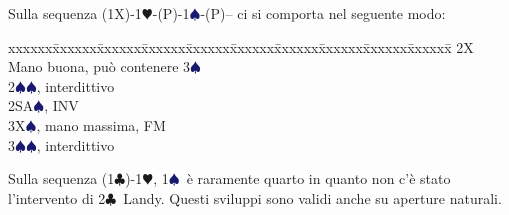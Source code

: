\documentclass[a4paper,italian]{article}
\newcommand{\BC}{\textcolor{OliveGreen}{$\clubsuit$}}
\newcommand{\BH}{\textcolor{Red2}{$\varheartsuit${}}}
\newcommand{\BS}{\textcolor{MidnightBlue}{$\spadesuit${}}}
\newenvironment{bidtable}
{\begin{tabbing}

    xxxxxx\=xxxxxx\=xxxxxx\=xxxxxx\=xxxxxx\=xxxxxx\=xxxxxx\=xxxxxx\=xxxxxx\=xxxxxx\=\kill}
{\end{tabbing} }%
\newenvironment{sviluppi}
{\begin{tcolorbox}[colframe=azzurro,title=Sviluppi particolari]}
    {
\end{tcolorbox} }%
\begin{document}
\begin{multicols}{2}
    \begin{sviluppi}
        Sulla sequenza (1X)-1\BH-(P)-1\BS-(P)-- ci si comporta nel seguente modo:
        \begin{bidtable}
            2X\> Mano buona, può contenere 3\BS\\
            2\BS{}\BS, interdittivo\\
            2SA\BS, INV\\
            3X\BS, mano massima, FM\\
            3\BS{}\BS, interdittivo
        \end{bidtable}
        Sulla sequenza (1\BC)-1\BH, 1\BS\ è raramente quarto in quanto non c'è stato l'intervento di 2\BC\ Landy.
        Questi sviluppi sono validi anche su aperture naturali.

    \end{sviluppi}

\end{multicols}
\end{document}

